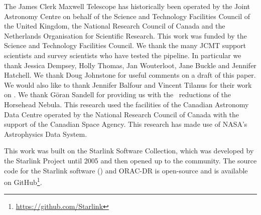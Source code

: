 \documentclass[final,authoryear,5p,times,twocolumn]{elsarticle}
\begin{document}
The James Clerk Maxwell Telescope has historically been operated by
the Joint Astronomy Centre on behalf of the Science and Technology
Facilities Council of the United Kingdom, the National Research
Council of Canada and the Netherlands Organisation for Scientific
Research. This work was funded by the Science and Technology Facilities
Council. We thank the many JCMT support scientists and survey
scientists who have tested the pipeline. In particular we thank
Jessica Dempsey, Holly Thomas, Jan Wouterloot, Jane Buckle and
Jennifer Hatchell. We thank Doug Johnstone for useful comments on a
draft of this paper. We would also like to thank Jennifer Balfour and
Vincent Tilanus for their work on \gsdacsis. We thank
G\"{o}ran Sandell for providing us with the \specx\ reductions of the Horsehead
Nebula. This research used the facilities of the Canadian Astronomy
Data Centre operated by the National Research Council of Canada with
the support of the Canadian Space Agency. This research has made use
of NASA's Astrophysics Data System.

This work was built on the Starlink Software Collection, which was
developed by the Starlink Project until 2005
\citep{1982QJRAS..23..485D,2005ASPC..347...22D,2008ASPC..394..650C}
and then opened up to the community. The source code for the Starlink
software () and ORAC-DR is open-source and is
available on GitHub\footnote{\url{https://github.com/Starlink}}.


\end{document}
